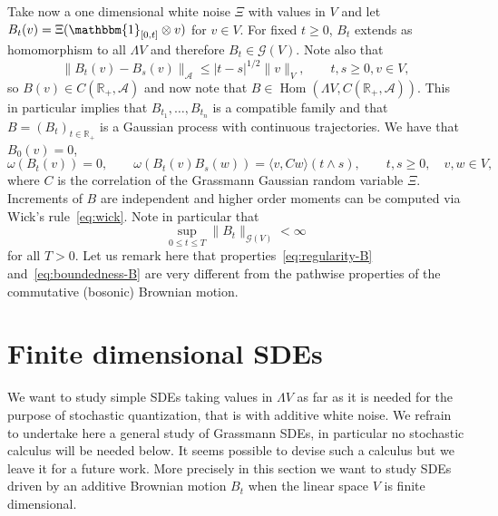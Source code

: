 \documentclass{article}
\newcommand{\tmop}[1]{\ensuremath{\operatorname{#1}}}
\begin{document}
Take now a one dimensional white noise $\Xi$ with values in $V$ and let $B_t
(v) = \Xi (\mathbbm{1}_{[0, t]} \otimes v)$ for $v \in V$. For fixed $t
\geqslant 0$, $B_t$ extends as homomorphism to all $\Lambda V$ and therefore
$B_t \in \mathcal{G} (V)$. Note also that
\begin{equation}
  \| B_t (v) - B_s (v) \|_{\mathcal{A}} \leqslant | t - s |^{1 / 2} \| v \|_V,
  \qquad t, s \geqslant 0, v \in V, \label{eq:regularity-B}
\end{equation}
so $B (v) \in C (\mathbb{R}_+, \mathcal{A})$ and now note that $B \in
\tmop{Hom} (\Lambda V, C (\mathbb{R}_+, \mathcal{A}))$. This in particular
implies that $B_{t_1}, \ldots, B_{t_n}$ is a compatible family and that $B =
(B_t)_{t \in \mathbb{R}_+}$ is a Gaussian process with continuous
trajectories. We have that $B_0 (v) = 0$,
\[ \omega (B_t (v)) = 0, \qquad \omega (B_t (v) B_s (w)) = \langle v, C w
   \rangle  (t \wedge s), \qquad t, s \geqslant 0, \quad v, w \in V, \]
where $C$ is the correlation of the Grassmann Gaussian random variable $\Xi$.
Increments of $B$ are independent and higher order moments can be computed via
Wick's rule~{\eqref{eq:wick}}. Note in particular that
\begin{equation}
  \sup_{0 \leqslant t \leqslant T} \| B_t \|_{\mathcal{G} (V)} < \infty
  \label{eq:boundedness-B}
\end{equation}
for all $T > 0$. Let us remark here that properties~{\eqref{eq:regularity-B}}
and~{\eqref{eq:boundedness-B}} are very different from the pathwise properties
of the commutative (bosonic) Brownian motion.

\section{Finite dimensional SDEs}\label{sec:finite-dim}

We want to study simple SDEs taking values in $\Lambda V$ as far as it is
needed for the purpose of stochastic quantization, that is with additive white
noise. We refrain to undertake here a general study of Grassmann SDEs, in
particular no stochastic calculus will be needed below. It seems possible to
devise such a calculus but we leave it for a future work. More precisely in
this section we want to study SDEs driven by an additive Brownian motion $B_t$
when the linear space $V$ is finite dimensional.
\end{document}
